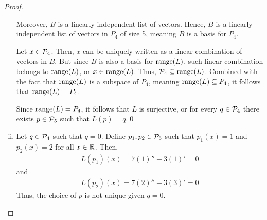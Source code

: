 \begin{proof}
\begin{enumerate}[(i)]
              Moreover, $B$ is a linearly independent list of vectors.
              Hence, $B$ is a linearly independent list of vectors in $P_4$ of size 5, meaning $B$ is a basis for $P_4$.

              Let $x\in\P_4$. Then, $x$ can be uniquely written as a linear combination of vectors in $B$.
              But since $B$ is also a basis for $\range(L)$, such linear combination belongs to $\range(L)$, or $x\in\range(L)$.
              Thus, $\P_4\subseteq\range(L)$.
              Combined with the fact that $\range(L)$ is a subspace of $P_4$, meaning $\range(L)\subseteq P_4$, it follows that $\range(L)=P_4$.

              Since $\range(L)=P_4$, it follows that $L$ is surjective, or for every $q\in\P_4$ there exists $p\in\P_5$ such that $L(p)=q$.\qed

        \item Let $q\in\P_4$ such that $q=0$. Define $p_1,p_2\in\P_5$ such that $p_1(x)=1$ and $p_2(x)=2$ for all $x\in\R$.
        Then, \begin{equation*}
            \begin{aligned}
                L(p_1)(x)=7(1)''+3(1)'=0
            \end{aligned}
        \end{equation*}
        and \begin{equation*}
            \begin{aligned}
                L(p_2)(x)=7(2)''+3(3)'=0
            \end{aligned}
        \end{equation*}
        Thus, the choice of $p$ is not unique given $q=0$.
    \end{enumerate}
    \renewcommand{\qedsymbol}{}
\end{proof}